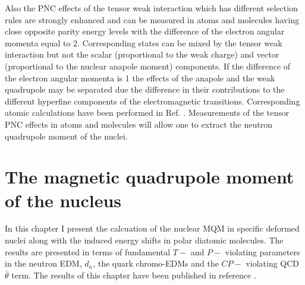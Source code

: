 \documentclass[10pt,a4paper, twoside, openright]{report}
\begin{document}
Also the PNC effects of the tensor weak interaction which has different selection rules are strongly enhanced  and can be measured in atoms and molecules having close opposite parity energy levels with the difference of the electron angular momenta equal to 2. Corresponding states can be mixed by the tensor weak interaction but not the scalar (proportional to the  weak charge) and vector (proportional to the nuclear anapole moment) components. If the difference of the electron angular momenta is 1 the effects of the anapole and the weak quadrupole may be separated due the difference in their contributions to the different hyperfine components of the electromagnetic transitions. Corresponding atomic calculations have been performed in Ref.  \cite{FDC17}. Measurements of the tensor PNC effects in atoms and molecules will allow one to extract  the neutron quadrupole moment of the nuclei. \\

\chapter{The magnetic quadrupole moment of the nucleus} \label{chap:MQM}
In this chapter I present the calcuation of the nuclear MQM in specific deformed nuclei along with the induced energy shifts in polar diatomic molecules. The results are presented in terms of fundamental $T-$ and $P-$ violating parameters in the neutron EDM, $d_n$, the quark chromo-EDMs and the $CP-$ violating QCD $\bar{\theta}$ term. The results of this chapter have been published in reference \cite{LFMQM2018}.
\end{document}
